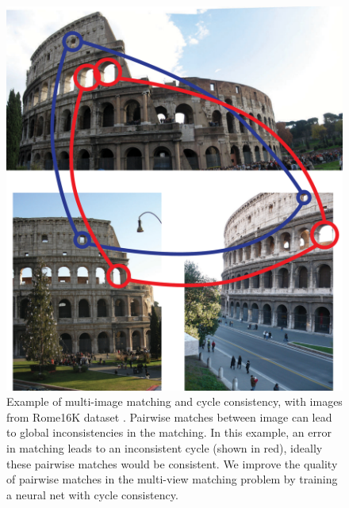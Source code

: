\documentclass[10pt,twocolumn,letterpaper]{article}
\begin{document}
\begin{figure}[t]
\begin{center}
  \includegraphics[width=0.8\linewidth]{figures-CycleConsistencyBasic-v2.pdf}
\end{center}
  \caption{
    Example of multi-image matching and cycle consistency, with images from Rome16K dataset \cite{li2010location}.
    Pairwise matches between image can lead to global inconsistencies in the matching.
    In this example, an error in matching leads to an inconsistent cycle (shown in red), ideally these pairwise matches would be consistent.
    We improve the quality of pairwise matches in the multi-view matching problem by training a neural net with cycle consistency.
  }
\label{fig:cycconsistex}
\label{fig:onecol}
\end{figure}
\end{document}
